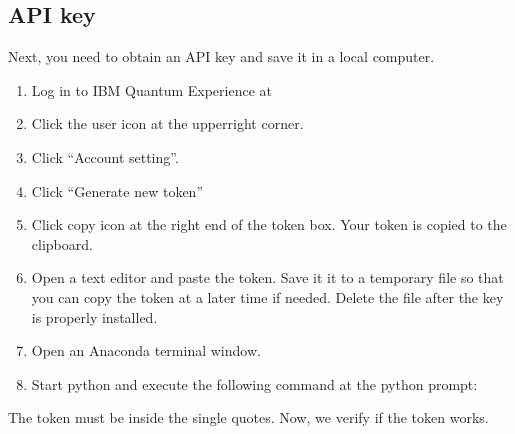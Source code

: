 \documentclass[letterpaper,10pt,english]{jupyterBook}
\begin{document}
\subsection{API key}
\label{\detokenize{preparation/qiskit:api-key}}
\sphinxAtStartPar
Next, you need to obtain an API key and save it in a local computer.
\begin{enumerate}
%
\item {}
\sphinxAtStartPar
Log in to IBM Quantum Experience at 

\item {}
\sphinxAtStartPar
Click the user icon at the upper\sphinxhyphen{}right corner.

\item {}
\sphinxAtStartPar
Click “Account setting”.

\item {}
\sphinxAtStartPar
Click “Generate new token”

\item {}
\sphinxAtStartPar
Click copy icon at the right end of the token box.  Your token is copied to the clipboard.

\item {}
\sphinxAtStartPar
Open a text editor and paste the token.  Save it it to a temporary file so that you can copy the token at a later time if needed. Delete the file after the key is properly installed.

\item {}
\sphinxAtStartPar
Open an Anaconda terminal window.

\item {}
\sphinxAtStartPar
Start python and execute the following command at the python prompt:

\end{enumerate}

\begin{sphinxVerbatim}[commandchars=\\\{\}]
   
\end{sphinxVerbatim}

\sphinxAtStartPar
The token must be inside the single quotes.  Now, we verify if the token works.
\end{document}
